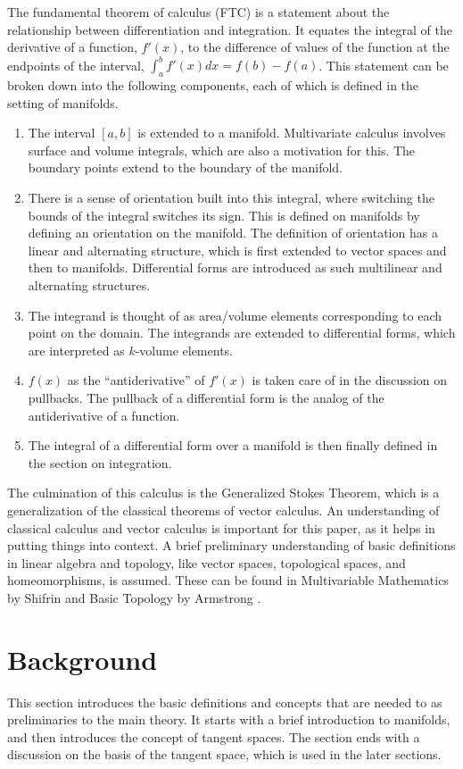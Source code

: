 \documentclass{article}
\theoremstyle{definition}
\theoremstyle{named}
\newcounter{definition}[section]
\begin{document}
The fundamental theorem of calculus (FTC) is a statement about the relationship between differentiation and integration. It equates the integral of the derivative of a function, $f'(x)$, to the difference of values of the function at the endpoints of the interval, $\int_a^bf'(x)dx = f(b) - f(a)$. This statement can be broken down into the following components, each of which is defined in the setting of manifolds.
\begin{enumerate}
    \item The interval $[a, b]$ is extended to a manifold. Multivariate calculus involves surface and volume integrals, which are also a motivation for this. The boundary points extend to the boundary of the manifold.
    \item There is a sense of orientation built into this integral, where switching the bounds of the integral switches its sign. This is defined on manifolds by defining an orientation on the manifold. The definition of orientation has a linear and alternating structure, which is first extended to vector spaces and then to manifolds. Differential forms are introduced as such multilinear and alternating structures.
    \item The integrand is thought of as area/volume elements corresponding to each point on the domain. The integrands are extended to differential forms, which are interpreted as $k$-volume elements.
    \item $f(x)$ as the “antiderivative” of $f'(x)$ is taken care of in the discussion on pullbacks. The pullback of a differential form is the analog of the antiderivative of a function.
    \item The integral of a differential form over a manifold is then finally defined in the section on integration.
\end{enumerate}


The culmination of this calculus is the Generalized Stokes Theorem, which is a generalization of the classical theorems of vector calculus. An understanding of classical calculus and vector calculus is important for this paper, as it helps in putting things into context. A brief preliminary understanding of basic definitions in linear algebra and topology, like vector spaces, topological spaces, and homeomorphisms, is assumed. These can be found in Multivariable Mathematics by Shifrin \cite{shifrin2004multivariable} and Basic Topology by Armstrong \cite{armstrong2013basic}. 

 
\section{Background}
This section introduces the basic definitions and concepts that are needed to as preliminaries to the main theory. It starts with a brief introduction to manifolds, and then introduces the concept of tangent spaces. The section ends with a discussion on the basis of the tangent space, which is used in the later sections.
\end{document}
